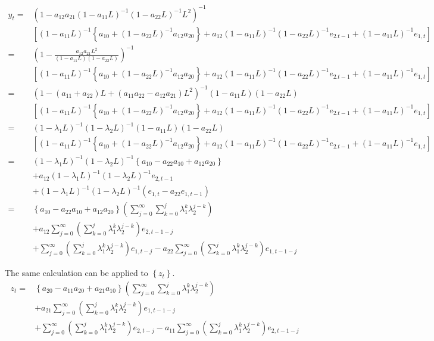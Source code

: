 \documentclass{article}
\begin{document}
\begin{align*}
	y_t = &\left( 1 - a_{12}a_{21} (1-a_{11}L)^{-1}(1-a_{22}L)^{-1} L^2\right)^{-1} \\
	&\left[(1-a_{11}L)^{-1} \left\{ a_{10}+(1-a_{22}L)^{-1} a_{12}a_{20} \right\}
	+ a_{12}(1-a_{11}{L})^{-1}(1-a_{22}L)^{-1}e_{2.t-1} + (1-a_{11}L)^{-1}e_{1,t} \right]\\[8pt]
	= &\left( 1 - \frac{a_{12}a_{21}L^2}{(1-a_{11}L)(1-a_{22}L)}\right)^{-1}\\
	&\left[(1-a_{11}L)^{-1} \left\{ a_{10}+(1-a_{22}L)^{-1} a_{12}a_{20} \right\}
	+ a_{12}(1-a_{11}{L})^{-1}(1-a_{22}L)^{-1}e_{2.t-1} + (1-a_{11}L)^{-1}e_{1,t} \right]\\[8pt]
	=&\left( 1-(a_{11} + a_{22})L + (a_{11}a_{22} - a_{12}a_{21})L^2 \right)^{-1} \left( 1-a_{11}L \right) \left( 1-a_{22}L \right)\\
	&\left[(1-a_{11}L)^{-1} \left\{ a_{10}+(1-a_{22}L)^{-1} a_{12}a_{20} \right\}
	+ a_{12}(1-a_{11}{L})^{-1}(1-a_{22}L)^{-1}e_{2.t-1} + (1-a_{11}L)^{-1}e_{1,t} \right]\\[8pt]
	=& (1- \lambda_1 L)^{-1} (1- \lambda_2 L)^{-1} \left( 1-a_{11}L \right) \left( 1-a_{22}L \right)\\
	&\left[(1-a_{11}L)^{-1} \left\{ a_{10}+(1-a_{22}L)^{-1} a_{12}a_{20} \right\}
	+ a_{12}(1-a_{11}{L})^{-1}(1-a_{22}L)^{-1}e_{2.t-1} + (1-a_{11}L)^{-1}e_{1,t} \right]\\[8pt]
	= & (1- \lambda_1 L)^{-1} (1- \lambda_2 L)^{-1} \left\{ a_{10} - a_{22} a_{10} + a_{12} a_{20} \right\}\\
	&+ a_{12} \left( 1-\lambda_1 L \right)^{-1} (1- \lambda_2 L)^{-1} e_{2,t-1}\\
	&+ (1- \lambda_1 L)^{-1} (1- \lambda_2 L)^{-1} \left( e_{1,t} - a_{22}e_{1,t-1} \right)\\[8pt]
	=&  \left\{ a_{10} - a_{22} a_{10} + a_{12} a_{20} \right\} \left( \sum_{j = 0}^{\infty} \sum_{k = 0}^{j} \lambda_1^k \lambda_2^{j-k} \right)\\
	&+a_{12} \sum_{j = 0}^{\infty}\left( \sum_{k = 0}^j \lambda_1^k \lambda_2^{j-k}\right) e_{2, t-1-j}\\
	&+  \sum_{j = 0}^{\infty} \left( \sum_{k = 0}^j \lambda_1^k \lambda_2^{j-k}\right) e_{1, t-j } - a_{22}  \sum_{j = 0}^{\infty} \left( \sum_{k = 0}^j \lambda_1^k \lambda_2^{j-k}\right) e_{1, t-1-j }
\end{align*}

The same calculation can be applied to $\left\{ z_t \right\}$.
\begin{align*}
	z_t =& \left\{ a_{20} - a_{11} a_{20} + a_{21} a_{10} \right\} \left( \sum_{j = 0}^{\infty} \sum_{k = 0}^{j} \lambda_1^k \lambda_2^{j-k} \right)\\
	&+a_{21} \sum_{j = 0}^{\infty}\left( \sum_{k = 0}^j \lambda_1^k \lambda_2^{j-k}\right) e_{1, t-1-j}\\
	&+  \sum_{j = 0}^{\infty} \left( \sum_{k = 0}^j \lambda_1^k \lambda_2^{j-k}\right) e_{2, t-j } - a_{11}  \sum_{j = 0}^{\infty} \left( \sum_{k = 0}^j \lambda_1^k \lambda_2^{j-k}\right) e_{2, t-1-j }
\end{align*}
\end{document}
